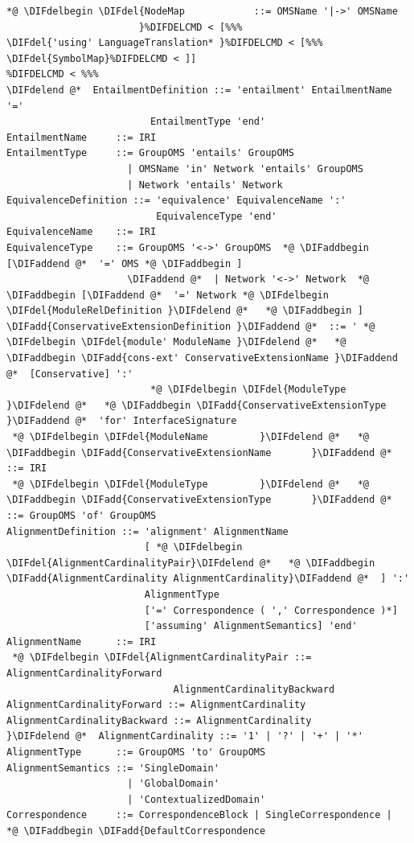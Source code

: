 \documentclass[10pt,fleqn,final]{scrreprt}
\providecommand{\DIFadd}[1]{{\protect\color{blue}\uwave{#1}}} %
\providecommand{\DIFdel}[1]{{\protect\color{red}\sout{#1}}}                      %
\providecommand{\DIFaddbegin}{} %
\providecommand{\DIFaddend}{} %
\providecommand{\DIFdelbegin}{} %
\providecommand{\DIFdelend}{} %
\begin{document}
\begin{lstlisting}[language=ebnf,mathescape]
 *@ \DIFdelbegin \DIFdel{NodeMap            ::= OMSName '|->' OMSName
                       }%DIFDELCMD < [%%%
\DIFdel{'using' LanguageTranslation* }%DIFDELCMD < [%%%
\DIFdel{SymbolMap}%DIFDELCMD < ]]
%DIFDELCMD < %%%
\DIFdelend @*  EntailmentDefinition ::= 'entailment' EntailmentName '='
                         EntailmentType 'end'
EntailmentName     ::= IRI
EntailmentType     ::= GroupOMS 'entails' GroupOMS
                     | OMSName 'in' Network 'entails' GroupOMS
                     | Network 'entails' Network
EquivalenceDefinition ::= 'equivalence' EquivalenceName ':'
                          EquivalenceType 'end'
EquivalenceName    ::= IRI
EquivalenceType    ::= GroupOMS '<->' GroupOMS  *@ \DIFaddbegin [\DIFaddend @*  '=' OMS *@ \DIFaddbegin ]
                     \DIFaddend @*  | Network '<->' Network  *@ \DIFaddbegin [\DIFaddend @*  '=' Network *@ \DIFdelbegin \DIFdel{ModuleRelDefinition }\DIFdelend @*   *@ \DIFaddbegin ]
\DIFadd{ConservativeExtensionDefinition }\DIFaddend @*  ::= ' *@ \DIFdelbegin \DIFdel{module' ModuleName }\DIFdelend @*   *@ \DIFaddbegin \DIFadd{cons-ext' ConservativeExtensionName }\DIFaddend @*  [Conservative] ':'
                         *@ \DIFdelbegin \DIFdel{ModuleType }\DIFdelend @*   *@ \DIFaddbegin \DIFadd{ConservativeExtensionType }\DIFaddend @*  'for' InterfaceSignature
 *@ \DIFdelbegin \DIFdel{ModuleName         }\DIFdelend @*   *@ \DIFaddbegin \DIFadd{ConservativeExtensionName       }\DIFaddend @*  ::= IRI
 *@ \DIFdelbegin \DIFdel{ModuleType         }\DIFdelend @*   *@ \DIFaddbegin \DIFadd{ConservativeExtensionType       }\DIFaddend @*  ::= GroupOMS 'of' GroupOMS
AlignmentDefinition ::= 'alignment' AlignmentName
                        [ *@ \DIFdelbegin \DIFdel{AlignmentCardinalityPair}\DIFdelend @*   *@ \DIFaddbegin \DIFadd{AlignmentCardinality AlignmentCardinality}\DIFaddend @*  ] ':'
                        AlignmentType
                        ['=' Correspondence ( ',' Correspondence )*]
                        ['assuming' AlignmentSemantics] 'end'
AlignmentName      ::= IRI
 *@ \DIFdelbegin \DIFdel{AlignmentCardinalityPair ::= AlignmentCardinalityForward
                             AlignmentCardinalityBackward
AlignmentCardinalityForward ::= AlignmentCardinality
AlignmentCardinalityBackward ::= AlignmentCardinality
}\DIFdelend @*  AlignmentCardinality ::= '1' | '?' | '+' | '*'
AlignmentType      ::= GroupOMS 'to' GroupOMS
AlignmentSemantics ::= 'SingleDomain'
                     | 'GlobalDomain'
                     | 'ContextualizedDomain'
Correspondence     ::= CorrespondenceBlock | SingleCorrespondence |  *@ \DIFaddbegin \DIFadd{DefaultCorrespondence

\end{lstlisting}
\end{document}
